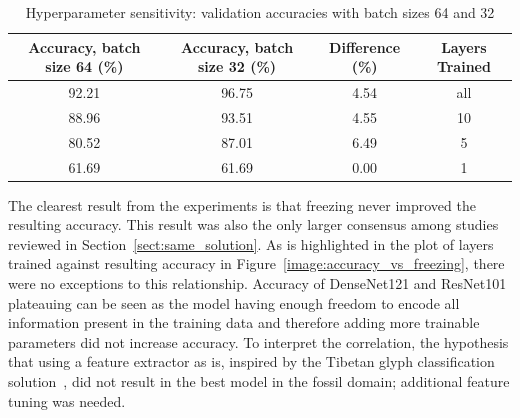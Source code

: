 \documentclass[english,twoside,openright]{UH_DS_MSc}
\begin{document}
\begin{table}[ht]
    \centering
        \scriptsize
        \begin{tabular}{|c|c|c|c|}
            \hline
            \textbf{Accuracy, batch size 64 (\%)} & \textbf{Accuracy, batch size 32 (\%)} & \textbf{Difference} (\%) & \textbf{Layers Trained} \\ \hline
            92.21 & 96.75 & 4.54 & all \\\hline
            88.96 & 93.51 & 4.55 & 10  \\\hline
            80.52 & 87.01 & 6.49 & 5   \\\hline
            61.69 & 61.69 & 0.00 & 1   \\\hline
        \end{tabular}
    \caption{Hyperparameter sensitivity: validation accuracies with batch sizes 64 and 32}
    \label{table:hyperparameter_sensitivity}
\end{table}

The clearest result from the experiments is that freezing never improved the resulting accuracy. This result was 
also the only larger consensus among studies reviewed in Section~\ref{sect:same_solution}.
As is highlighted in the plot of layers trained against resulting accuracy in Figure~\ref{image:accuracy_vs_freezing},
there were no exceptions to this relationship. Accuracy of DenseNet121 and ResNet101 plateauing can be seen as 
the model having enough freedom to encode all information present in the training data and therefore adding 
more trainable parameters did not increase accuracy. To interpret the correlation, the hypothesis that using a feature 
extractor as is, inspired by the Tibetan glyph classification solution~\cite{4zhaoTibetan}, did not result in the 
best model in the fossil domain; additional feature tuning was needed.
\end{document}
